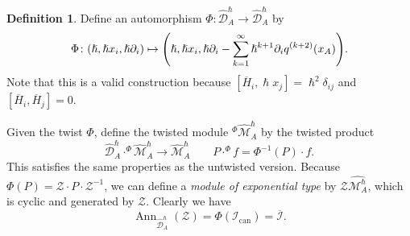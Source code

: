 \documentclass[leqno, openany]{memoir}
\theoremstyle{definition}
\newtheorem{defn}[thm]{Definition}
\theoremstyle{remark}
\theoremstyle{plain}
\theoremstyle{definition}
\theoremstyle{remark}
\newcommand{\mc}[1]{\mathcal{#1}}
\newcommand{\mr}[1]{\mathrm{#1}}
\newcommand{\on}[1]{\operatorname{#1}}
\newcommand{\ol}[1]{\overline{#1}}
\newcommand{\wh}[1]{\widehat{#1}}
\begin{document}
\begin{defn}
    Define an automorphism $\Phi \colon \wh{\mc{D}}_A^{\hslash} \to \wh{\mc{D}}_A^{\hslash}$ by
    \[ \Phi \colon (\hslash, \hslash x_i, \hslash \partial_i) \mapsto \qty(\hslash, \hslash x_i, \hslash \partial_i - \sum_{k=1}^{\infty} \hslash^{k+1} \partial_i q^{(k+2)}(x_A)). \]
    Note that this is a valid construction because $[\ol{H}_i, \hslash x_j] = \hslash^2 \delta_{ij}$ and $[\ol{H}_i, \ol{H}_j] = 0$.
\end{defn}

Given the twist $\Phi$, define the twisted module ${}^{\Phi}\wh{\mc{M}}_A^{\hslash}$ by the twisted product
\[ \wh{\mc{D}}_A^{\hslash} \cdot^{\Phi} \wh{\mc{M}}_A^{\hslash} \to \wh{\mc{M}}_A^{\hslash} \qquad P \cdot^{\Phi} f = \Phi^{-1}(P) \cdot f. \]
This satisfies the same properties as the untwisted version. Because $\Phi(P) = \mc{Z} \cdot P \cdot \mc{Z}^{-1}$, we can define a \textit{module of exponential type} by $\mc{Z} \wh{\mc{M}_A^{\hslash}}$, which is cyclic and generated by $\mc{Z}$. Clearly we have
\[ \on{Ann}_{\wh{\mc{D}}_A^{\hslash}}(\mc{Z}) = \Phi(\mc{I}_{\mr{can}}) = \ol{\mc{I}}. \]

\printbibliography
\end{document}
